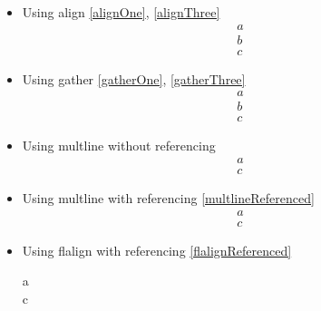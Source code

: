 \documentclass{article}
\def\ifautonum#1{#1}%
\def\ifautonum#1{}%
\def\ifcleveref#1{#1}%
\def\ifcleveref#1{}%
\begin{document}
\begin{itemize}
		\ifcleveref{
			\item Using a cref inside a caption
				\begin{figure}
					cref
					\caption{\cref{long}}
				\end{figure}
			\item Using cref with one argument
				\begin{equation}\label{crefOne}
					g
				\end{equation}
				\cref{crefOne}
			\item Using cref with two arguments
				\begin{equation}\label{crefTwo}
					cr = ef
				\end{equation}
				\cref{crefOne,crefTwo}
			\ifautonum{
				\item Using otherwise unused cref with two arguments (needs autonum)
					\[\label{crefThree}
						cr = ef
					\]
					\[\label{crefFour}
						cr = ef
					\]
					\cref{crefThree,crefFour}
			}
		}
		\item Using align \ref{alignOne}, \ref{alignThree}
			\begin{align}
				a\label{alignOne}\\
				b\label{alignTwo}\\
				c\label{alignThree}
			\end{align}
		\item Using gather \ref{gatherOne}, \ref{gatherThree}
			\begin{gather}
				a\label{gatherOne}\\
				b\label{gatherTwo}\\
				c\label{gatherThree}
			\end{gather}
		\item Using multline without referencing
			\begin{multline}
				a\\
				c\label{multlineUnreferenced}
			\end{multline}
		\item Using multline with referencing \ref{multlineReferenced}
			\begin{multline}
				a\\
				c\label{multlineReferenced}
			\end{multline}
		\item Using flalign with referencing \ref{flalignReferenced}
			\begin{flalign}
				a\\
				c\label{flalignReferenced}
			\end{flalign}

\end{itemize}
\end{document}
